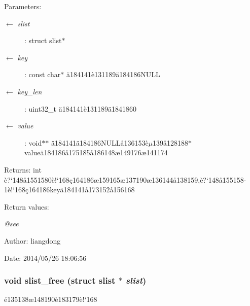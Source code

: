 \begin{Desc}
\item[Parameters:]
\begin{description}
\item[\mbox{$\leftarrow$} {\em slist}]: struct slist$\ast$ \item[\mbox{$\leftarrow$} {\em key}]: const char$\ast$ \"{a}184141\`{e}131189\"{a}184186NULL \item[\mbox{$\leftarrow$} {\em key\_\-len}]: uint32\_\-t \"{a}184141\`{e}131189\"{a}1841860 \item[\mbox{$\leftarrow$} {\em value}]: void$\ast$$\ast$ \"{a}184141\"{a}184186NULL\aa{}136153\`{e}$\mu$139\aa{}128188$\ast$value\"{a}184186\aa{}175185\aa{}186148\ae{}149176\ae{}141174 \end{description}
\end{Desc}
\begin{Desc}
\item[Returns:]int \`{e}?`148\aa{}1551580\`{e}!`168\c{c}164186\ae{}159165\ae{}137190\ae{}136144\aa{}138159,\`{e}?`148\aa{}155158-1\`{e}!`168\c{c}164186key\"{a}184141\aa{}173152\aa{}156168 \end{Desc}
\begin{Desc}
\item[Return values:]
\begin{description}
\item[{\em @see}]\end{description}
\end{Desc}
\begin{Desc}
\item[Author:]liangdong \end{Desc}
\begin{Desc}
\item[Date:]2014/05/26 18:06:56 \end{Desc}
\subsubsection{\setlength{\rightskip}{0pt plus 5cm}void slist\_\-free (struct slist $\ast$ {\em slist})}\label{slist_8h_a1}


\'{e}135138\ae{}148190\`{e}183179\`{e}!`168 

